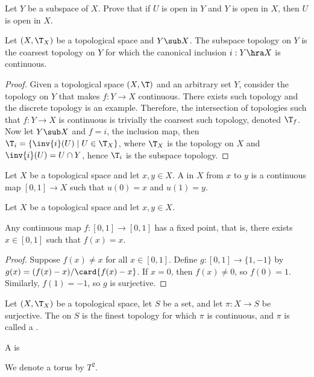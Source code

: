 \documentclass[10pt]{article}
\begin{document}
\begin{problem}
    Let $Y$ be a subspace of $X$. Prove that if $U$ is open in $Y$ and $Y$ is open in $X$, then $U$ is open in $X$.
\end{problem}
\begin{proposition}
    Let $(X,{\T}_{X})$ be a topological space and $Y\sub X$. The subspace topology on $Y$ is the coarsest topology on $Y$ for which the canonical inclusion $i:Y\hra X$ is continuous.
\end{proposition}
\begin{proof}
    Given a topological space $(X,{\T})$ and an arbitrary set $Y$, consider the topology on $Y$ that makes $f:Y\to X$ continuous. There exists such topology and the discrete topology is an example. Therefore, the intersection of topologies such that $f:Y\to X$ is continuous is trivially the coarsest such topology, denoted ${\T}_{f}$. Now let $Y\sub X$ and $f=i$, the inclusion map, then ${\T}_{i}=\{\inv{i}(U)\mid U\in{\T}_{X}\}$, where ${\T}_{X}$ is the topology on $X$ and $\inv{i}(U)=U\cap Y$, hence ${\T}_{i}$ is the subspace topology.
\end{proof}


\begin{definition}
    Let $X$ be a topological space and let $x,y\in X$. A  in $X$ from $x$ to $y$ is a continuous map $[0,1]\to X$ such that $u(0)=x$ and $u(1)=y$.
\end{definition}
\par
Let $X$ be a topological space and let $x,y\in X$. 


\begin{theorem}
    Any continuous map $f:[0,1]\to[0,1]$ has a fixed point, that is, there exists $x\in[0,1]$ such that $f(x)=x$.
\end{theorem}
\begin{proof}
    Suppose $f(x)\ne x$ for all $x\in[0,1]$. Define $g:[0,1]\to\{1,-1\}$ by $g(x)=(f(x)-x)/\card{f(x)-x}$. If $x=0$, then $f(x)\ne 0$, so $f(0)=1$. Similarly, $f(1)=-1$, so $g$ is surjective.
\end{proof}




\begin{definition}
    Let $(X,{\T}_{X})$ be a topological space, let $S$ be a set, and let $\pi:X\to S$ be surjective. The  on $S$ is the finest topology for which $\pi$ is continuous, and $\pi$ is called a .
\end{definition}
\begin{example}
    A  is 

    We denote a torus by ${T}^{2}$.
\end{example}
\end{document}
